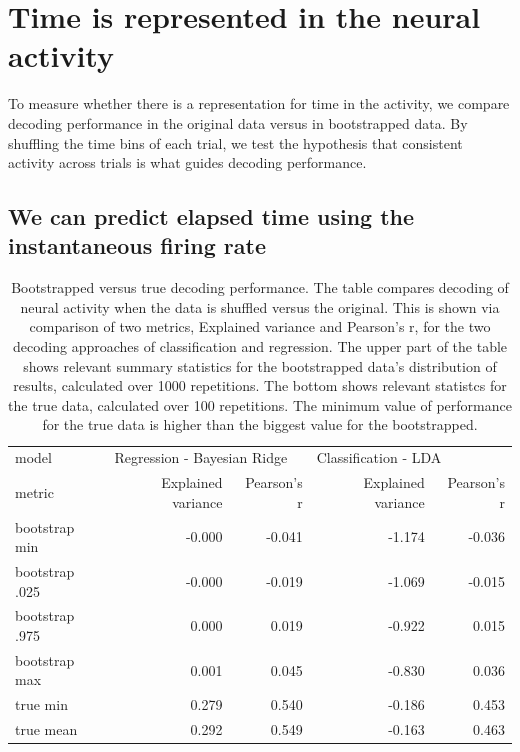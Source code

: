 \chapter{Time is represented in the neural activity}
To measure whether there is a representation for time in the activity, we compare decoding performance in the original data versus in bootstrapped data. By shuffling the time bins of each trial, we test the hypothesis that consistent activity across trials is what guides decoding performance.

\section{We can predict elapsed time using the instantaneous firing rate}
    \begin{table}[]
        \centering
        \begin{tabular}{l|rr|rr}
            \hline
            model & \multicolumn{2}{l}{Regression - Bayesian Ridge} & \multicolumn{2}{l}{Classification - LDA} \\
            metric & Explained variance & Pearson's r & Explained variance & Pearson's r \\
            \hline
            bootstrap min  &             -0.000 &      -0.041 &             -1.174 &      -0.036 \\
            bootstrap .025  &             -0.000 &      -0.019 &             -1.069 &      -0.015 \\
            bootstrap .975 &              0.000 &       0.019 &             -0.922 &       0.015 \\
            bootstrap max  &              0.001 &       0.045 &             -0.830 &       0.036 \\
            \hline
            true min  &              0.279 &       0.540 &             -0.186 &       0.453 \\
            true mean &              0.292 &       0.549 &             -0.163 &       0.463 \\
            \hline
        \end{tabular}
        \caption{Bootstrapped versus true decoding performance. The table compares decoding of neural activity when the data is shuffled versus the original. This is shown via comparison of two metrics, Explained variance and Pearson's r, for the two decoding approaches of classification and regression. The upper part of the table shows relevant summary statistics for the bootstrapped data's distribution of results, calculated over 1000 repetitions. The bottom shows relevant statistcs for the true data, calculated over 100 repetitions. The minimum value of performance for the true data is higher than the biggest value for the bootstrapped.}
        \label{tab:bootstrap_time_representation}
    \end{table}
    
